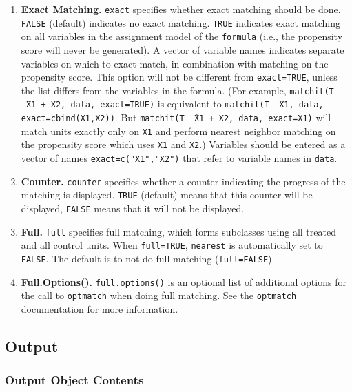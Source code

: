 \documentclass[oneside,letterpaper,titlepage]{article}
\begin{document}
\begin{enumerate}
\item \textbf{Exact Matching.}  \texttt{exact} specifies whether exact
  matching should be done.  \texttt{FALSE} (default) indicates no
  exact matching.  \texttt{TRUE} indicates exact matching on all
  variables in the assignment model of the \texttt{formula} (i.e., the
  propensity score will never be generated).  A vector of variable
  names indicates separate variables on which to exact match, in
  combination with matching on the propensity score.  This option will
  not be different from \texttt{exact=TRUE}, unless the list differs
  from the variables in the formula.  (For example, \texttt{matchit(T
    \~\ X1 + X2, data, exact=TRUE)} is equivalent to \texttt{matchit(T
    \~\ X1, data, exact=cbind(X1,X2))}.  But \texttt{matchit(T \~\ X1
    + X2, data, exact=X1)} will match units exactly only on
  \texttt{X1} and perform nearest neighbor matching on the propensity
  score which uses \texttt{X1} and \texttt{X2}.)  Variables should be
  entered as a vector of names \texttt{exact=c("X1","X2")} that refer
  to variable names in \texttt{data}.
  
\item \textbf{Counter.} \texttt{counter} specifies whether a counter
  indicating the progress of the matching is displayed.  \texttt{TRUE}
  (default) means that this counter will be displayed, \texttt{FALSE}
  means that it will not be displayed.

\item \textbf{Full.}  \texttt{full} specifies full matching, which forms subclasses using all
treated and all control units.  When \texttt{full=TRUE}, \texttt{nearest} is automatically set to \texttt{FALSE}.
The default is to not do full matching (\texttt{full=FALSE}).  

\item \textbf{Full.Options().}  \texttt{full.options()} is an optional list of additional options for
the call to \texttt{optmatch} when doing full matching.  See the \texttt{optmatch} documentation for more information.

\end{enumerate}
  
\subsection{Output}

\subsubsection{Output Object Contents}
\end{document}
